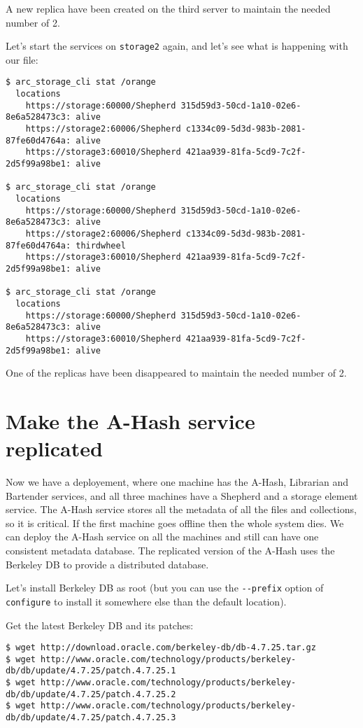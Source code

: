 \documentclass{book}
\begin{document}
A new replica have been created on the third server to maintain the needed number of 2.

Let's start the services on \verb!storage2! again, and let's see what is happening with our file:

\begin{verbatim}
$ arc_storage_cli stat /orange
  locations
    https://storage:60000/Shepherd 315d59d3-50cd-1a10-02e6-8e6a528473c3: alive
    https://storage2:60006/Shepherd c1334c09-5d3d-983b-2081-87fe60d4764a: alive
    https://storage3:60010/Shepherd 421aa939-81fa-5cd9-7c2f-2d5f99a98be1: alive

$ arc_storage_cli stat /orange
  locations
    https://storage:60000/Shepherd 315d59d3-50cd-1a10-02e6-8e6a528473c3: alive
    https://storage2:60006/Shepherd c1334c09-5d3d-983b-2081-87fe60d4764a: thirdwheel
    https://storage3:60010/Shepherd 421aa939-81fa-5cd9-7c2f-2d5f99a98be1: alive

$ arc_storage_cli stat /orange
  locations
    https://storage:60000/Shepherd 315d59d3-50cd-1a10-02e6-8e6a528473c3: alive
    https://storage3:60010/Shepherd 421aa939-81fa-5cd9-7c2f-2d5f99a98be1: alive
\end{verbatim}

One of the replicas have been disappeared to maintain the needed number of 2.

\section{Make the A-Hash service replicated} %
\label{sec:make_the_a_hash_service_replicated}

Now we have a deployement, where one machine has the A-Hash, Librarian and Bartender services, and all three machines have a Shepherd and a storage element service. The A-Hash service stores all the metadata of all the files and collections, so it is critical. If the first machine goes offline then the whole system dies. We can deploy the A-Hash service on all the machines and still can have one consistent metadata database. The replicated version of the A-Hash uses the Berkeley DB to provide a distributed database.

Let's install Berkeley DB as root (but you can use the \verb!--prefix! option of \verb!configure! to install it somewhere else than the default location).

Get the latest Berkeley DB and its patches:
\begin{verbatim}
$ wget http://download.oracle.com/berkeley-db/db-4.7.25.tar.gz
$ wget http://www.oracle.com/technology/products/berkeley-db/db/update/4.7.25/patch.4.7.25.1
$ wget http://www.oracle.com/technology/products/berkeley-db/db/update/4.7.25/patch.4.7.25.2
$ wget http://www.oracle.com/technology/products/berkeley-db/db/update/4.7.25/patch.4.7.25.3
\end{verbatim}
\end{document}
